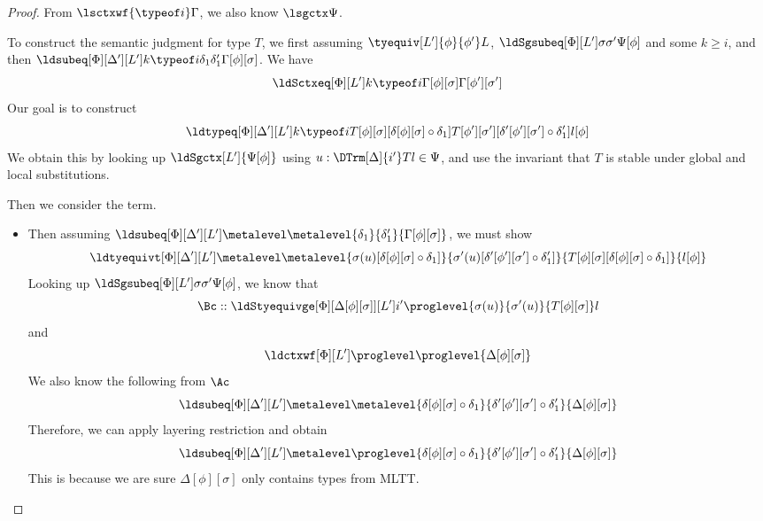 \begin{proof}
  From $\lsctxwf {\typeof i} \Gamma$, we also know $\lsgctx \Psi$. %

  To construct the semantic judgment for type $T$, we first assuming
  $\tyequiv[L']{\phi}{\phi'}L$, $\ldSgsubeq[\Phi][L'] \sigma{\sigma'}{\Psi[\phi]}$ and
  some $k \ge i$, and then
  $\ldsubeq[\Phi][\Delta'][L'] k{\typeof i}{\delta_1}{\delta_1'}{\Gamma[\phi][\sigma]}$. %
  We have
  \[
    \ldSctxeq[\Phi][L'] k{\typeof i} {\Gamma[\phi][\sigma]}{\Gamma[\phi'][\sigma']}
  \]
  Our goal is to construct
  \[
    \ldtypeq[\Phi][\Delta'][L'] k{\typeof
      i}{T[\phi][\sigma][\delta[\phi][\sigma] \circ \delta_1]}{T[\phi'][\sigma'][\delta'[\phi'][\sigma'] \circ \delta_1']}{l[\phi]}
  \]
  We obtain this by looking up $\ldSgctx[L']{\Psi[\phi]}$ using
  $u : \DTrm[\Delta]{i'}T l \in \Psi$, and use the invariant that $T$ is stable under
  global and local substitutions. 
  
  Then we consider the term. %
  \begin{itemize}
  \item[Case $i = \metalevel$] Then assuming
    $\ldsubeq[\Phi][\Delta'][L'] \metalevel \metalevel{\delta_1}{\delta_1'}{\Gamma[\phi][\sigma]}$, we must show
    \[
      \ldtyequivt[\Phi][\Delta'][L'] \metalevel \metalevel{\sigma(u)[\delta[\phi][\sigma]\circ
        \delta_1]}{\sigma'(u)[\delta'[\phi'][\sigma']\circ
        \delta_1']}{T[\phi][\sigma][\delta[\phi][\sigma] \circ \delta_1]}{l[\phi]}
    \]
    Looking up $\ldSgsubeq[\Phi][L'] \sigma{\sigma'}{\Psi[\phi]}$, we know that
    \[
      \Bc :: \ldStyequivge[\Phi][\Delta[\phi][\sigma]][L']{i'} \proglevel{\sigma(u)}{\sigma'(u)}{T[\phi][\sigma]} l
    \]
    and
    \[
      \ldctxwf[\Phi][L'] \proglevel \proglevel{\Delta[\phi][\sigma]}
    \]
    We also know the following from $\Ac$
    \[
      \ldsubeq[\Phi][\Delta'][L'] \metalevel \metalevel{\delta[\phi][\sigma] \circ
        \delta_1}{\delta'[\phi'][\sigma'] \circ \delta_1'}{\Delta[\phi][\sigma]}
    \]
    Therefore, we can apply layering restriction and obtain
    \[
      \ldsubeq[\Phi][\Delta'][L'] \metalevel \proglevel{\delta[\phi][\sigma] \circ
        \delta_1}{\delta'[\phi'][\sigma'] \circ \delta_1'}{\Delta[\phi][\sigma]}
    \]
    This is because we are sure $\Delta[\phi][\sigma]$ only contains types from MLTT.
    

\end{itemize}
\end{proof}
